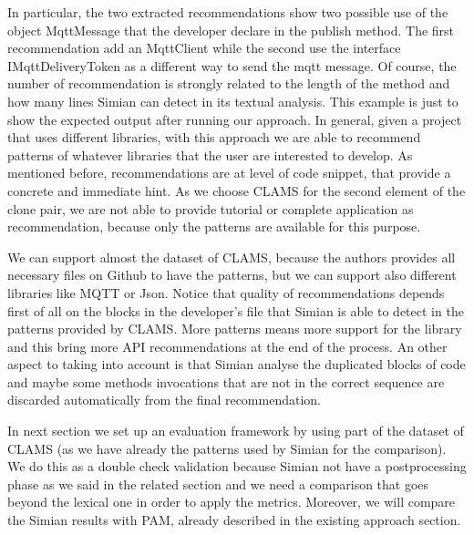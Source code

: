 
In particular, the two extracted recommendations show two possible use of the object MqttMessage that the developer declare in the publish method. The first recommendation add an MqttClient while the second use the interface IMqttDeliveryToken as a different way to send the mqtt message. Of course, the number of recommendation is strongly related to the length of the method and how many lines Simian can detect in its textual analysis. This example is just to show the expected output after running our approach. In general, given a project that uses different libraries, with this approach we are able to recommend patterns of whatever libraries that the user are interested to develop. As mentioned before, recommendations are at level of code snippet, that provide a concrete and immediate hint. As we choose CLAMS for the second element of the clone pair, we are not able to provide tutorial or complete application as recommendation, because only the patterns are available for this purpose.

We can support almost the dataset of CLAMS, because the authors provides all necessary files on Github to have the patterns, but we can support also different libraries like MQTT or Json. Notice that quality of recommendations depends first of all on the blocks in the developer's file that Simian is able to detect in the patterns provided by CLAMS. More patterns means more support for the library and this bring more API recommendations at the end of the process. An other aspect to taking into account is that Simian analyse the duplicated blocks of code and maybe some methods invocations that are not in the correct sequence are discarded automatically from the final recommendation.

In next section we set up an evaluation framework  by using part of the dataset of CLAMS (as we have already the patterns used by Simian for the comparison). We do this as a double check validation because Simian not have a postprocessing phase as we said in the related section and we need a comparison that goes beyond the lexical one in order to apply the metrics. Moreover, we will compare the Simian results with PAM, already described in the existing approach section.




